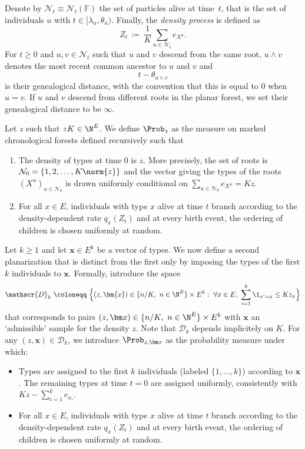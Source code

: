 \begin{refsegment}
Denote by 
$\mathcal{N}_t\equiv 
\mathcal{N}_t(\mathbb{F})$ the set of particles alive at time~$t$, that is the set of individuals $u$ with $t\in[ \lambda_u,\theta_u)$. Finally, 
the \textit{density process} is defined as
\[
Z_t\ \coloneqq\ \frac{1}{K}\sum_{u\in\mathcal{N}_t} e_{X^u}.
\]
For $t\geq 0$ and $u, v\in \mathcal{N}_t$ such that $u$ and $v$ descend from the same root, 
 $ u\wedge v$ denotes the most recent common ancestor to $u$ and $v$ and
 \[
 t -\theta_{u\wedge v}
 \] 
 is their genealogical distance, with the convention that this is equal to $0$ when $u=v$. If $u$ and $v$ descend from different roots in the planar forest, we set their genealogical distance to be $\infty$.

\medskip


Let $z$ such that $z K \in \N^E$. We define $\Prob_{z}$ as the measure on marked chronological forests defined recursively such that 
\begin{enumerate}
\item The density of types at time $0$ is $z$. More precisely, the set of roots is $\mathcal{N}_0=\{1,2,\dots,K\norm{z}\}$ and the vector giving the types of the roots $(X^u)_{u\in \mathcal{N}_0}$ is drawn uniformly conditional on $\sum_{u\in \mathcal{N}_0} e_{X^u} = Kz$.
\item For all $x\in E$, individuals with type $x$ alive at time $t$ branch according to the density-dependent rate $q_{x}(Z_t)$ and 
at every birth event, the ordering of children  is chosen uniformly at random.
\end{enumerate}

Let $k \ge 1$ and let $\bm{x} \in E^k$ be a vector of types. We now define a second planarization that is distinct from the first only by imposing the types of the first $k$ individuals to $\bm{x}$. Formally,
introduce the space 
\begin{equation}\label{Ch4:eq:space_k_types}
\mathscr{D}_{k}\ \coloneqq\ \Big\{(z, \bm{x})\in \{n/K,\ n\in \N^{E}\}\times  E^k:\ \forall x\in E,\ \sum_{i=1}^k \1_{x^i=x} \leq Kz_x \Big\}
\end{equation}
that corresponds to pairs $(z, \bm x)\in \{n/K,\ n\in \N^{E}\}\times  E^k$ with ${\bm x}$ an `admissible' sample for the density $z$.  Note that $\mathscr{D}_k$ depends implicitely on $K$.
For any $(z,\bm x) \in \mathscr{D}_{k}$, we introduce $\Prob_{z,\bm x}$ as the probability measure under which:
\begin{itemize} 
    \item Types are assigned to the first $k$ individuals (labeled $\{1,\ldots, k\}$) according to ${\bm x}$. The remaining types at time $t=0$ are assigned uniformly, consistently with $K z - \sum_{i=1}^k e_{x_i}$.
    \item For all $x\in E$, individuals with type $x$ alive at time $t$ branch according to the density-dependent rate $q_{x}(Z_t)$ and 
at every birth event, the ordering of children  is chosen uniformly at random.
\end{itemize}




\end{refsegment}

